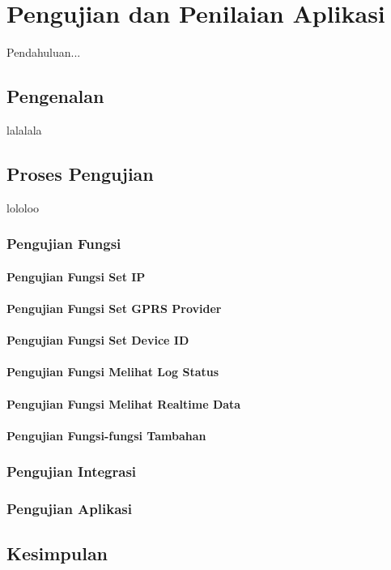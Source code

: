 \chapter{Pengujian dan Penilaian Aplikasi}\label{c1}
Pendahuluan...

\section{Pengenalan}
lalalala

\section{Proses Pengujian}
lololoo

\subsection{Pengujian Fungsi}

\subsubsection{Pengujian Fungsi Set IP}

\subsubsection{Pengujian Fungsi Set GPRS Provider}

\subsubsection{Pengujian Fungsi Set Device ID}

\subsubsection{Pengujian Fungsi Melihat Log Status}

\subsubsection{Pengujian Fungsi Melihat Realtime Data}

\subsubsection{Pengujian Fungsi-fungsi Tambahan}

\subsection{Pengujian Integrasi}

\subsection{Pengujian Aplikasi}

\section{Kesimpulan}

